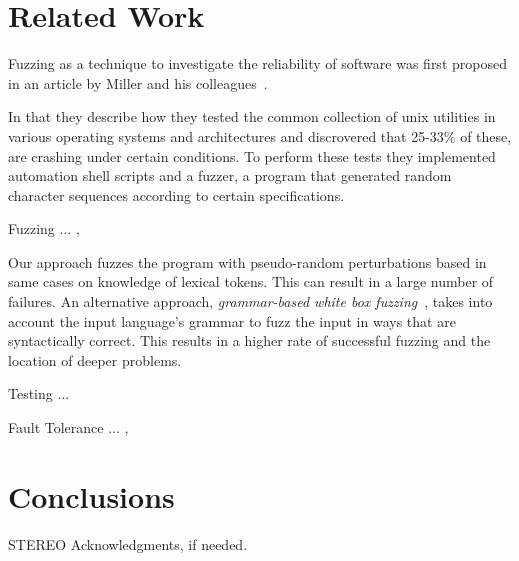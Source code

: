 \documentclass[10pt]{sigplanconf}
\begin{document}
\section{Related Work} %
\label{sec:related}

Fuzzing as a technique to investigate the reliability of software
was first proposed in an article by Miller and his colleagues~\cite{MFS90}.

In that they describe how they tested the common collection of {\sc unix}
utilities in various operating systems and architectures and discrovered that
25-33\% of these, are crashing under certain conditions. To perform these tests
they implemented automation shell scripts and a fuzzer, a program that generated
random character sequences according to certain specifications.

Fuzzing ... \cite{TJC08}, \cite{WWGZ11}

Our approach fuzzes the program with pseudo-random
perturbations based in same cases on knowledge of
lexical tokens.
This can result in a large number of failures.
An alternative approach, {\em grammar-based white box fuzzing}~\cite{God08},
takes into account the input language's grammar to fuzz the input in
ways that are syntactically correct.
This results in a higher rate of successful fuzzing and the location
of deeper problems.

Testing ... \cite{HAM06}

Fault Tolerance ... \cite{KOKR07}, \cite{LYU95}

\section{Conclusions} %
\label{sec:conclusions}


\acks

STEREO
Acknowledgments, if needed.








\end{document}
